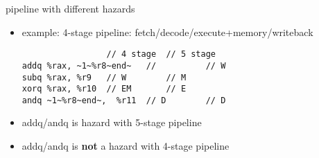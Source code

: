 \begin{frame}[fragile,label=diffHaz]{pipeline with different hazards}
    \begin{itemize}
        \item example: 4-stage pipeline: fetch/decode/execute+memory/writeback
\begin{lstlisting}
                 // 4 stage  // 5 stage
addq %rax, ~1~%r8~end~   //          // W
subq %rax, %r9   // W        // M
xorq %rax, %r10  // EM       // E
andq ~1~%r8~end~,  %r11  // D        // D
\end{lstlisting}
        \item<2> addq/andq is hazard with 5-stage pipeline
        \item<2> addq/andq is \textbf{not} a hazard with 4-stage pipeline
    \end{itemize}
\end{frame}

